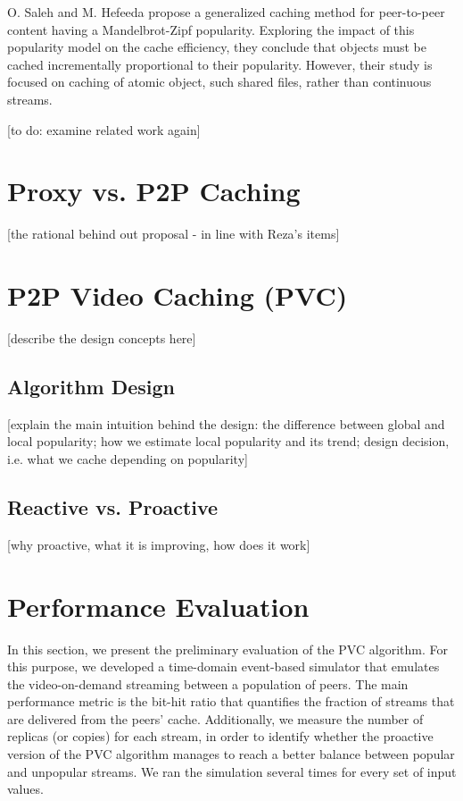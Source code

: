 \documentclass{acm_proc_article-sp}
\begin{document}
O. Saleh and M. Hefeeda \cite{saleh2006modeling} propose a generalized caching method for peer-to-peer content having a Mandelbrot-Zipf popularity. Exploring the impact of this popularity model on the cache efficiency, they conclude that objects must be cached incrementally proportional to their popularity. However, their study is focused on caching of atomic object, such shared files, rather than continuous streams.

[to do: examine related work again]

\section{Proxy vs. P2P Caching}

[the rational behind out proposal - in line with Reza's items]


\section{P2P Video Caching (PVC)}

[describe the design concepts here]

\subsection{Algorithm Design}

[explain the main intuition behind the design: the difference between global and local popularity; how we estimate local popularity and its trend; design decision, i.e. what we cache depending on popularity]

\subsection{Reactive vs. Proactive} 

[why proactive, what it is improving, how does it work]

\section{Performance Evaluation}

In this section, we present the preliminary evaluation of the PVC algorithm. For this purpose, we developed a time-domain event-based simulator that emulates the video-on-demand streaming between a population of peers. 
The main performance metric is the bit-hit ratio that quantifies the fraction of streams that are delivered from the peers' cache. Additionally, we measure the number of replicas (or copies) for each stream, in order to identify whether the proactive version of the PVC algorithm manages to reach a better balance between popular and unpopular streams. We ran the simulation several times for every set of input values.
\end{document}
